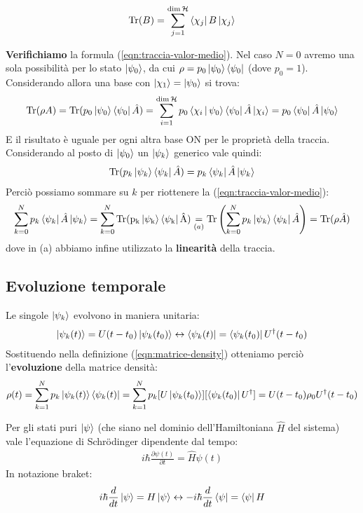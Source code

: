 \documentclass[../../InformazioneQuantistica.tex]{subfiles}
\begin{document}
\begin{align*}
\operatorname{Tr}(B)=\sum_{j=1}^{\operatorname{dim}\mathcal{H}} \Bra{\chi_j}B\Ket{\chi_j}
\end{align*}
\begin{expl}
\textbf{Verifichiamo} la formula (\ref{eqn:traccia-valor-medio}). Nel caso $N=0$ avremo una sola possibilità per lo stato $\Ket{\psi_0}$, da cui $\rho = p_0\Ket{\psi_0}\Bra{\psi_0}$ (dove $p_0=1$). Considerando allora una base con $\Ket{\chi_1} = \Ket{\psi_0}$ si trova:
\begin{align*}
\operatorname{Tr}(\rho A) =
\operatorname{Tr}(p_0\Ket{\psi_0}\Bra{\psi_0}\hat{A})=\sum_{i=1}^{\operatorname{dim}\mathcal{H}}p_0 \Braket{\chi_i|\psi_0}\Bra{\psi_0}\hat{A}\Ket{\chi_i}=p_0 \Bra{\psi_0}\hat{A}\Ket{\psi_0}
\end{align*} 
E il risultato è uguale per ogni altra base ON per le proprietà della traccia. Considerando al posto di $\Ket{\psi_0}$ un $\Ket{\psi_k}$ generico vale quindi:
\begin{align*}
\operatorname{Tr}(p_k\Ket{\psi_k}\Bra{\psi_k}\hat{A})=p_k\Bra{\psi_k}\hat{A}\Ket{\psi_k}
\end{align*}
Perciò possiamo sommare su $k$ per riottenere la (\ref{eqn:traccia-valor-medio}):
\begin{align*}
\sum_{k=0}^N p_k \Bra{\psi_k}\hat{A}\Ket{\psi_k}=\sum_{k=0}^N\operatorname{Tr(p_k\Ket{\psi_k}\Bra{\psi_k}\hat{A}}) \underset{(a)}{=} \operatorname{Tr}\left(\sum_{k=0}^{N} p_k \Ket{\psi_k}\Bra{\psi_k}\hat{A}\right)=\operatorname{Tr}(\rho \hat{A})
\end{align*}
dove in (a) abbiamo infine utilizzato la \textbf{linearità} della traccia.
\end{expl}

\subsection{Evoluzione temporale}
Le singole $\Ket{\psi_k}$ evolvono in maniera unitaria:
\begin{align*}
\Ket{\psi_k(t)} = U(t-t_0) \Ket{\psi_k(t_0)} \leftrightarrow \Bra{\psi_k(t)} = \Bra{\psi_k(t_0)} U^\dag (t-t_0)
\end{align*}
Sostituendo nella definizione (\ref{eqn:matrice-density}) otteniamo perciò l'\textbf{evoluzione} della matrice densità:
\begin{align*}
\rho(t) = \sum_{k=1}^N p_k \Ket{\psi_k(t)}\Bra{\psi_k(t)} = \sum_{k=1}^N p_k [U\Ket{\psi_k(t_0)}][\Bra{\psi_k(t_0)}U^\dag] = U(t-t_0) \rho_0 U^\dag(t-t_0)
\end{align*}

Per gli stati puri $\Ket{\psi}$ (che siano nel dominio dell'Hamiltoniana $\hat{H}$ del sistema) vale l'equazione di Schr\"odinger dipendente dal tempo:
\begin{align}
i\hbar \frac{\partial \psi(t)}{\partial t} = \hat{H}\psi(t)
\label{eqn:schrody-temp}
\end{align}
In notazione braket:
\begin{align}
    i \hbar \frac{d}{dt} \Ket{\psi} = H\Ket{\psi} \leftrightarrow -i\hbar \frac{d}{dt}\Bra{\psi} = \Bra{\psi}H
    \label{eqn:schrody-ket}
\end{align}
\end{document}
